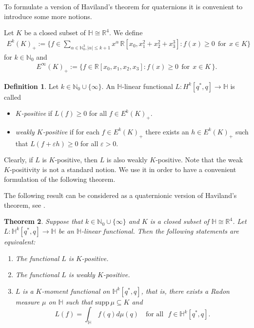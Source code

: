 \documentclass[11pt,a4paper]{amsart}
\newtheorem{theorem}{Theorem}[section]
\theoremstyle{definition}
\newtheorem{definition}[theorem]{Definition}
\begin{document}
To formulate a version of Haviland's theorem for quaternions it is convenient
to introduce some more notions.

Let $K$ be a closed subset of $\mathbb{H}\cong \mathbb{R}^{4}$. We define
%
\begin{align*}
E^{k}(K)_{+}:=\Big\{f\in \sum _{\alpha \in \mathbb{N}_{0}^{3}, |
\alpha |\leq k+1} x^{\alpha}\, \mathbb{R}[x_{0},x_{1}^{2}+x_{2}^{2}+x_{3}^{3}]:
f(x)\geq 0~~ \textrm{for}~~ x\in K \Big\}
\end{align*}
%
for $k\in \mathbb{N}_{0}$ and
%
\begin{align*}
E^{\infty}(K)_{+}:= \big\{ f\in \mathbb{R}[x_{0},x_{1},x_{2},x_{3}]: f(x)
\geq 0~~ \textrm{for}~~ x\in K\, \big\}.
\end{align*}

\begin{definition}%
\label{kpositivity}
Let $k\in \mathbb{N}_{0}\cup \{\infty \}$. An $\mathbb{H}$-linear functional
$L: H^{k}[q^{*}, q] \to \mathbb{H}$ is called
\begin{itemize}
\item[$\bullet $] \emph{$K$-positive} if $L(f)\geq 0$ for all
$f\in E^{k}(K)_{+}$.

\item[$\bullet $] \emph{weakly $K$-positive} if for each
$f\in E^{k}(K)_{+}$ there exists an $h\in E^{k}(K)_{+}$ such that
$L(f+\varepsilon h) \geq 0$  for all $\varepsilon >0$.
\end{itemize}
\end{definition}

Clearly, if $L$ is $K$-positive, then $L$ is also weakly $K$-positive.
Note that the weak $K$-positivity is not a standard notion. We use it in
order to have a convenient formulation of the following theorem.

The following result can be considered as a quaternionic version of Haviland's
theorem, see  \cite{Haviland1936}.
%
\begin{theorem}
\label{thm:quaternion_haviland}
Suppose that $k\in \mathbb{N}_{0}\cup \{\infty \}$ and $K$ is a closed
subset of $\mathbb{H}\cong \mathbb{R}^{4}$. Let
$L: \mathbb{H}^{k}[q^{*}, q] \to \mathbb{H}$ be an $\mathbb{H}$-linear
functional. Then the following statements are equivalent:
%
\begin{enumerate}
%
\item[\emph{(i)}] The functional $L$ is $K$-positive.
%
\item[\emph{(ii)}] The functional $L$ is weakly $K$-positive.
%
\item[\emph{(iii)}] $L$ is a $K$-moment functional on
$\mathbb{H}^{k}[q^{*}, q]$, that is, there exists a Radon measure
$\mu $ on $\mathbb{H}$ such that $\mathrm{supp}\, \mu \subseteq K$ and
%
\begin{equation*}
L(f) = \int _{\mathbb{H}}\, f(q) d\mu (q)\quad \text{for all} ~~~ f
\in \mathbb{H}^{k}[q^{*}, q].
\end{equation*}
%
\end{enumerate}%
\end{theorem}
\end{document}
